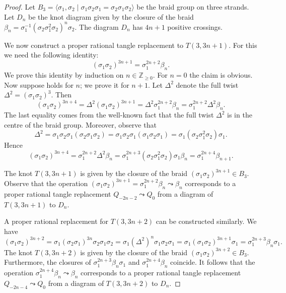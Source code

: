 \documentclass[11pt,a4paper,twoside]{amsart}
\let\cref\Cref
\theoremstyle{definition}
\newcommand{\Z}{\mathbb{Z}}
\begin{document}
\begin{proof}
    Let $B_3=\langle \sigma_1,\sigma_2 \;|\; \sigma_1\sigma_2\sigma_1 = \sigma_2\sigma_1\sigma_2 \rangle$ be the braid group on three strands.
    Let $D_n$ be the knot diagram given by the closure of the braid $\beta_n=\sigma_1^{-1}(\sigma_2\sigma_1^2\sigma_2)^n \sigma_2$. The diagram $D_n$ has $4n+1$ positive crossings.
    
    We now construct a proper rational tangle replacement to $T(3,3n+1)$. For this we need the following identity: 
    \begin{equation}\label{eq:2n+1_twists}
        (\sigma_1 \sigma_2)^{3n+1}=\sigma_1^{2n+2}\beta_n.
    \end{equation}
    We prove this identity by induction on $n\in\Z_{\geq 0}$. 
    For $n=0$ the claim is obvious.
    Now suppose \cref{eq:2n+1_twists} holds for $n$; we prove it for $n+1$. 
    Let $\Delta^2$ denote the full twist $\Delta^2=(\sigma_1\sigma_2)^3$. 
    Then 
    \[
    (\sigma_1 \sigma_2)^{3n+4}
    =
    \Delta^2(\sigma_1 \sigma_2)^{3n+1}
    =
    \Delta^2\sigma_1^{2n+2}\beta_n
    =
    \sigma_1^{2n+2}\Delta^2\beta_n.
    \]
    The last equality comes from the well-known fact that the full twist $\Delta^2$ is in the centre of the braid group.
    Moreover, observe that 
    \[
    \Delta^2
    =
    \sigma_1\sigma_2\sigma_1(\sigma_2\sigma_1\sigma_2
)    =
    \sigma_1\sigma_2\sigma_1(\sigma_1\sigma_2\sigma_1)    
    =
    \sigma_1(\sigma_2\sigma_1^2\sigma_2)\sigma_1.
    \]
    Hence
    \[
    (\sigma_1 \sigma_2)^{3n+4}
    =
    \sigma_1^{2n+2}\Delta^2\beta_n
    =
    \sigma_1^{2n+3}(\sigma_2\sigma_1^2\sigma_2)\sigma_1\beta_n
    =
    \sigma_1^{2n+4}\beta_{n+1}.
    \]

    The knot $T(3,3n+1)$ is given by the closure of the braid $(\sigma_1 \sigma_2)^{3n+1}\in B_3$.
    Observe that the operation $(\sigma_1 \sigma_2)^{3n+1}=\sigma_1^{2n+2}\beta_n \leadsto \beta_n$ corresponds to a proper rational tangle replacement $Q_{-2n-2} \leadsto Q_{0}$ from a diagram of $T(3,3n+1)$ to $D_n$. 

    A proper rational replacement for $T(3,3n+2)$ can be constructed similarly.
		We have
    \[
    (\sigma_1 \sigma_2)^{3n+2}
    =
    \sigma_1(\sigma_2 \sigma_1)^{3n} \sigma_2\sigma_1\sigma_2
    =
    \sigma_1(\Delta^2)^{n} \sigma_1\sigma_2\sigma_1
    =
    \sigma_1(\sigma_1 \sigma_2)^{3n+1}\sigma_1
    =
    \sigma_1^{2n+3}\beta_n\sigma_1.
    \]
    The knot $T(3,3n+2)$ is given by the closure of the braid $(\sigma_1 \sigma_2)^{3n+2}\in B_3$.
    Furthermore, the closures of $\sigma_1^{2n+3}\beta_n\sigma_1$ and $\sigma_1^{2n+4}\beta_n$ coincide.
    It follows that the operation ${\sigma_1^{2n+4}\beta_n \leadsto \beta_n}$ corresponds to a proper rational tangle replacement $Q_{-2n-4} \leadsto Q_{0}$ from a diagram of $T(3,3n+2)$ to $D_n$. 
\end{proof}
\end{document}

